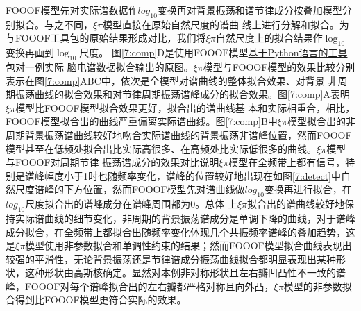 FOOOF模型先对实际谱数据作$log_{10}$变换再对背景振荡和谱节律成分按叠加模型分别拟合。与之不同，$\xi\pi$模型直接在原始自然尺度的谱曲
线上进行分解和拟合。为与FOOOF工具包的原始结果形成对比，我们将$\xi\pi$自然尺度上的拟合结果作$\log_{10}$变换再画到$\log_{10}$尺度。
图\ref{7:comp}D是使用FOOOF模型\href{https://github.com/fooof-tools/fooof/tree/master/fooof}{基于Python语言的工具包}对一例实际
脑电谱数据拟合输出的原图。$\xi\pi$模型与FOOOF模型的效果比较分别表示在图\ref{7:comp}ABC中，依次是全模型对谱曲线的整体拟合效果、对背景
非周期振荡曲线的拟合效果和对节律周期振荡谱峰成分的拟合效果。图\ref{7:comp}A表明$\xi\pi$模型比FOOOF模型拟合效果更好，拟合出的谱曲线基
本和实际相重合，相比，FOOOF模型拟合出的曲线严重偏离实际谱曲线。图\ref{7:comp}B中$\xi\pi$模型拟合出的非周期背景振荡谱曲线较好地吻合实际谱曲线的背景振荡非谱峰位置，然而FOOOF模型甚至在低频处拟合出比实际高很多、在高频处比实际低很多的曲线。$\xi\pi$模型与FOOOF对周期节律
振荡谱成分的效果对比说明$\xi\pi$模型在全频带上都有信号，特别是谱峰幅度小于1时也随频率变化，谱峰的位置较好地出现在如图\ref{7:detect}中自然尺度谱峰的下方位置，然而FOOOF模型先对谱曲线做$log_{10}$变换再进行拟合，在$log_{10}$尺度拟合出的谱峰成分在谱峰周围都为0。总体
上$\xi\pi$拟合出的谱曲线较好地保持实际谱曲线的细节变化，非周期的背景振荡谱成分是单调下降的曲线，对于谱峰成分拟合，在全频带上都拟合出随频率变化体现几个共振频率谱峰的叠加趋势，这是$\xi\pi$模型使用非参数拟合和单调性约束的结果；然而FOOOF模型拟合曲线表现出较强的平滑性，无论背景振荡还是节律谱成分振荡曲线拟合都明显表现出某种形状，这种形状由高斯核确定。显然对本例非对称形状且左右瓣凹凸性不一致的谱峰，FOOOF对每个谱峰拟合出的左右瓣都严格对称且向外凸，$\xi\pi$模型的非参数拟合得到比FOOOF模型更符合实际的效果。

